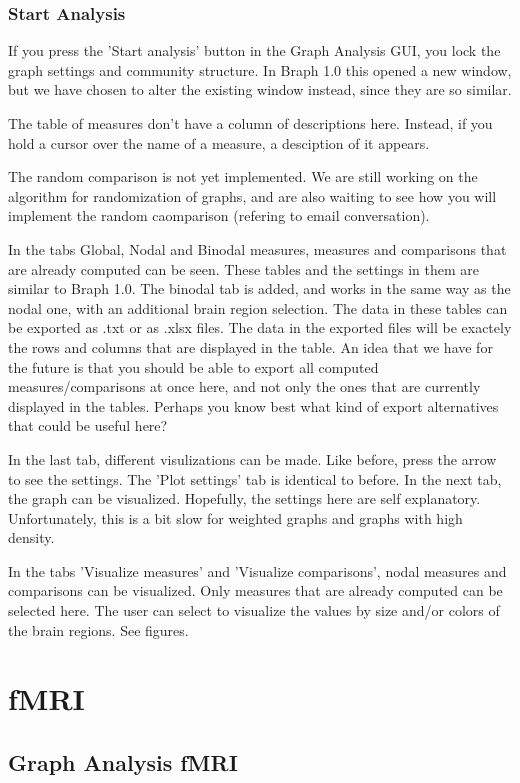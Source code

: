 \documentclass{article}
\begin{document}
\subsubsection{Start Analysis}

If you press the 'Start analysis' button in the Graph Analysis GUI, you lock the graph settings and community structure. In Braph 1.0 this opened a new window, but we have chosen to alter the existing window instead, since they are so similar. 

The table of measures don't have a column of descriptions here. Instead, if you hold a cursor over the name of a measure, a desciption of it appears. 

The random comparison is not yet implemented. We are still working on the algorithm for randomization of graphs, and are also waiting to see how you will implement the random caomparison (refering to email conversation).

In the tabs Global, Nodal and Binodal measures, measures and comparisons that are already computed can be seen. These tables and the settings in them are similar to Braph 1.0. The binodal tab is added, and works in the same way as the nodal one, with an additional brain region selection. The data in these tables can be exported as .txt or as .xlsx files. The data in the exported files will be exactely the rows and columns that are displayed in the table. An idea that we have for the future is that you should be able to export all computed measures/comparisons at once here, and not only the ones that are currently displayed in the tables. Perhaps you know best what kind of export alternatives that could be useful here?

In the last tab, different visulizations can be made. Like before, press the arrow to see the settings. The 'Plot settings' tab is identical to before. In the next tab, the graph can be visualized. Hopefully, the settings here are self explanatory. Unfortunately, this is a bit slow for weighted graphs and graphs with high density.

In the tabs 'Visualize measures' and 'Visualize comparisons', nodal measures and comparisons can be visualized. Only measures that are already computed can be selected here. The user can select to visualize the values by size and/or colors of the brain regions. See figures.




\section{fMRI}

\subsection{Graph Analysis fMRI}
\end{document}
